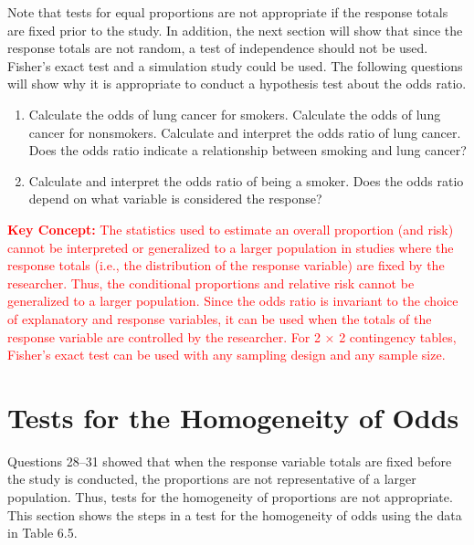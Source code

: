\documentclass[
]{report}
\providecommand{\tightlist}{%
  \setlength{\itemsep}{0pt}\setlength{\parskip}{0pt}}
\begin{document}
Note that tests for equal proportions are not appropriate if the response totals are fixed prior to the study. In addition, the next section will show that since the response totals are not random, a test of independence should not be used. Fisher's exact test and a simulation study could be used. The following questions will show why it is appropriate to conduct a hypothesis test about the odds ratio.

\begin{enumerate}
\def\labelenumi{\arabic{enumi}.}
\setcounter{enumi}{29}
\tightlist
\item
  Calculate the odds of lung cancer for smokers. Calculate the odds of lung cancer for nonsmokers. Calculate and interpret the odds ratio of lung cancer. Does the odds ratio indicate a relationship between smoking and lung cancer?\\
\item
  Calculate and interpret the odds ratio of being a smoker. Does the odds ratio depend on what variable is considered the response?
\end{enumerate}

\Large

\textbf{\textcolor{red}{Key Concept:}}
\textcolor{red}{The statistics used to estimate an overall proportion (and risk) cannot be interpreted or generalized to a larger population in studies where the response totals (i.e., the distribution of the response variable) are fixed by the researcher. Thus, the conditional proportions and relative risk cannot be generalized to a larger population. Since the odds ratio is invariant to the choice of explanatory and response variables, it can be used when the totals of the response variable are controlled by the researcher. For 2 × 2 contingency tables, Fisher’s exact test can be used with any sampling design and any sample size.}
\normalsize

\section*{Tests for the Homogeneity of Odds}\label{tests-for-the-homogeneity-of-odds}

Questions 28--31 showed that when the response variable totals are fixed before the study is conducted, the proportions are not representative of a larger population. Thus, tests for the homogeneity of proportions are not appropriate. This section shows the steps in a test for the homogeneity of odds using the data in Table 6.5.
\end{document}
